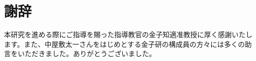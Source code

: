 \chapter*{謝辞}

本研究を進める際にご指導を賜った指導教官の金子知適准教授に厚く感謝いたします。また、中屋敷太一さんをはじめとする金子研の構成員の方々には多くの助言をいただきました。ありがとうございました。